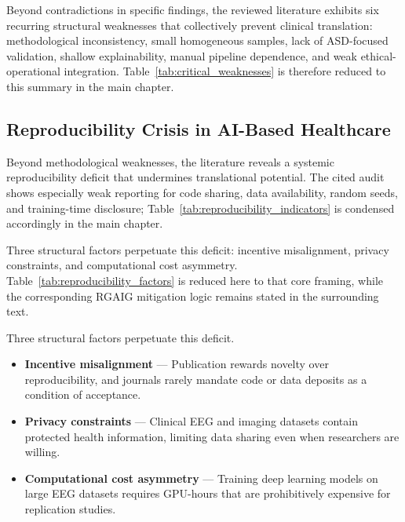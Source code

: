 Beyond contradictions in specific findings, the reviewed literature exhibits six recurring structural weaknesses that collectively prevent clinical translation: methodological inconsistency, small homogeneous samples, lack of ASD-focused validation, shallow explainability, manual pipeline dependence, and weak ethical-operational integration. Table~\ref{tab:critical_weaknesses} is therefore reduced to this summary in the main chapter.

\subsection{Reproducibility Crisis in AI-Based Healthcare}

Beyond methodological weaknesses, the literature reveals a systemic reproducibility deficit that undermines translational potential. The cited audit shows especially weak reporting for code sharing, data availability, random seeds, and training-time disclosure; Table~\ref{tab:reproducibility_indicators} is condensed accordingly in the main chapter.

Three structural factors perpetuate this deficit: incentive misalignment, privacy constraints, and computational cost asymmetry. Table~\ref{tab:reproducibility_factors} is reduced here to that core framing, while the corresponding RGAIG mitigation logic remains stated in the surrounding text.

\iffalse %
Three structural factors perpetuate this deficit.

\begin{itemize}[leftmargin=*, itemsep=3pt]
  \item \textbf{Incentive misalignment} --- Publication rewards novelty over reproducibility, and journals rarely mandate code or data deposits as a condition of acceptance.
  \item \textbf{Privacy constraints} --- Clinical EEG and imaging datasets contain protected health information, limiting data sharing even when researchers are willing.
  \item \textbf{Computational cost asymmetry} --- Training deep learning models on large EEG datasets requires GPU-hours that are prohibitively expensive for replication studies.
\end{itemize}

